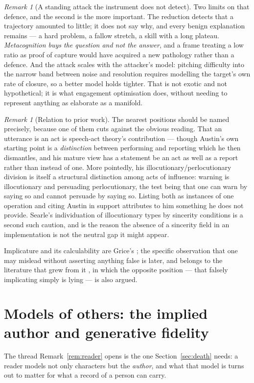 \documentclass[11pt,a4paper]{article}
\theoremstyle{remark}\newtheorem{remark}[definition]{Remark}
\begin{document}
\begin{remark}[A standing attack the instrument does not detect]
Two limits on that defence, and the second is the more important. The reduction detects that a
trajectory amounted to little; it does not say why, and every benign explanation remains --- a hard
problem, a fallow stretch, a skill with a long plateau. \emph{Metacognition buys the question and not
the answer}, and a frame treating a low ratio as proof of capture would have acquired a new pathology
rather than a defence. And the attack scales with the attacker's model: pitching difficulty into the
narrow band between noise and resolution requires modelling the target's own rate of closure, so a
better model holds tighter. That is not exotic and not hypothetical; it is what engagement
optimisation does, without needing to represent anything as elaborate as a manifold.
\end{remark}

\begin{remark}[Relation to prior work]\label{rem:comm-prior}
The nearest positions should be named precisely, because one of them cuts against the obvious reading. That an utterance is an act is speech-act theory's contribution
\citep{austin1962,searle1969} --- though Austin's own starting point is a \emph{distinction} between
performing and reporting which he then dismantles, and his mature view has a statement be an act as
well as a report rather than instead of one. More pointedly, his illocutionary/perlocutionary
division is itself a structural distinction among acts of influence: warning is illocutionary and
persuading perlocutionary, the test being that one can warn by saying so and cannot persuade by
saying so. Listing both as instances of one operation and citing Austin in support attributes to him something he does not provide. Searle's individuation of illocutionary types by sincerity conditions is a
second such caution, and is the reason the absence of a sincerity field in an implementation is not
the neutral gap it might appear.

Implicature and its calculability are Grice's \citep{grice1975}; the specific observation that one may
mislead without asserting anything false is later, and belongs to the literature that grew from it
\citep{adler1997,saul2012}, in which the opposite position --- that falsely implicating simply is
lying --- is also argued.
\end{remark}

\section{Models of others: the implied author and generative fidelity}\label{sec:other-models}
The thread Remark~\ref{rem:reader} opens is the one Section~\ref{sec:death} needs:
a reader models not only characters but the \emph{author}, and what that model is turns out to
matter for what a record of a person can carry.
\end{document}

